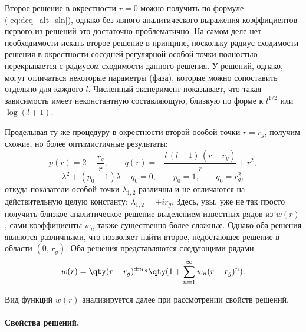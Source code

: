 \documentclass[\docroot/reports/draft/report.tex]{subfiles}
\begin{document}
        Второе решение в окрестности $r = 0$ можно получить по формуле (\ref{eq:deq_alt_sln}), однако без явного аналитического выражения коэффициентов первого из решений это достаточно проблематично. На самом деле нет необходимости искать второе решение в принципе, поскольку радиус сходимости решения в окрестности соседней регулярной особой точки полностью перекрывается с радиусом сходимости данного решения. У решений, однако, могут отличаться некоторые параметры (фаза), которые можно сопоставить отдельно для каждого $l$. Численный эксперимент показывает, что такая зависимость имеет неконстантную составляющую, близкую по форме к $l^{1/2}$ или $\log(l+1)$.

        Проделывая ту же процедуру в окрестности второй особой точки $r = r_g$, получим схожие, но более оптимистичные результаты:
        \begin{equation}
            p(r) = 2 - \frac{r_g}{r}, \qquad
            q(r) = -\frac{l\,(l+1)\,(r - r_g)}{r} + r^2 ,
        \end{equation}
        \begin{equation}
            \lambda^2 + (p_0 - 1) \lambda + q_0 = 0, \qquad
            p_0 = 1, \qquad q_0 = r_g^2 ,
        \end{equation}
        откуда показатели особой точки $\lambda_{1,2}$ различны и не отличаются на действительную целую константу: $\lambda_{1,2} = \pm i r_g$. Здесь, увы, уже не так просто получить близкое аналитическое решение выделением известных рядов из $w(r)$, сами коэффициенты $w_n$ также существенно более сложные. Однако оба решения являются различными, что позволяет найти второе, недостающее решение в области $(0,\,r_g)$. Оба решения представляются следующими рядами:
        \begin{equation}
            w(r) = \qty(r-r_g)^{\pm i r_g} \qty(1 + \sum\limits_{n = 1}^\infty w_n (r - r_g)^n) .
        \end{equation}

        Вид функций $w(r)$ анализируется далее при рассмотрении свойств решений.

    \paragraph{Свойства решений.}
\end{document}
